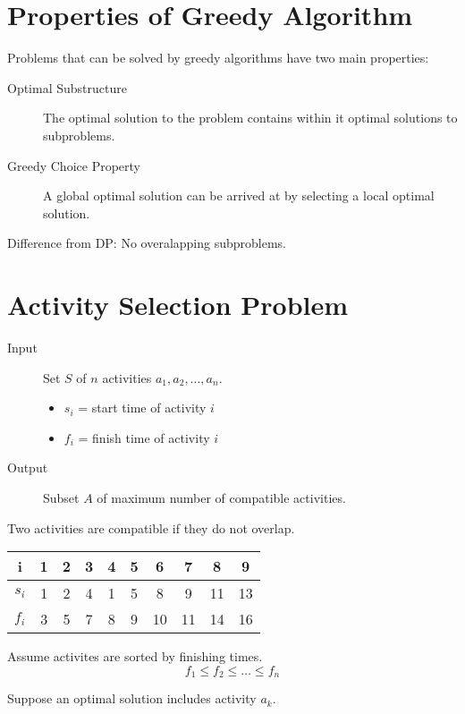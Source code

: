 \documentclass{article}
\begin{document}
\section*{Properties of Greedy Algorithm}
Problems that can be solved by greedy algorithms have two main properties:
\begin{description}
    \item[Optimal Substructure] The optimal solution to the problem contains
        within it optimal solutions to subproblems.
    \item[Greedy Choice Property] A global optimal solution can be arrived at by
        selecting a local optimal solution.
\end{description}

Difference from DP: No overalapping subproblems.

\section*{Activity Selection Problem}

\begin{description}
    \item[Input] Set \(S\) of \(n\) activities \(a_1, a_2, \ldots, a_n\).
        \begin{itemize}
            \item \(s_i\) = start time of activity \(i\)
            \item \(f_i\) = finish time of activity \(i\)
        \end{itemize}
    \item[Output] Subset \(A\) of maximum number of compatible activities.
\end{description}
Two activities are compatible if they do not overlap.

\begin{tabular}{c|ccccccccc}
    i       & 1 & 2 & 3 & 4 & 5 & 6  & 7  & 8  & 9  \\
    \hline
    \(s_i\) & 1 & 2 & 4 & 1 & 5 & 8  & 9  & 11 & 13 \\
    \(f_i\) & 3 & 5 & 7 & 8 & 9 & 10 & 11 & 14 & 16 \\
\end{tabular}

Assume activites are sorted by finishing times.
\begin{equation*}
    f_1 \leq f_2 \leq \ldots \leq f_n
\end{equation*}

Suppose an optimal solution includes activity \(a_k\).
\end{document}
